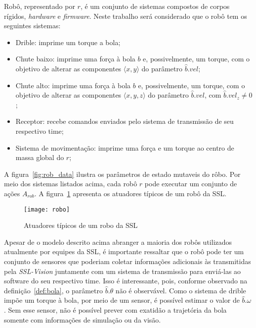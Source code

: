 
\begin{defi}[Robô]
  Robô, representado por $r$, é um conjunto de sistemas compostos
  de corpos rígidos, \textit{hardware} e \textit{firmware}. Neste
  trabalho será considerado que o robô tem os seguintes sistemas:

  \begin{itemize}
    \item Drible: imprime um torque a bola;
    \item Chute baixo: imprime uma força à bola $b$
          e, possivelmente, um torque, com o objetivo de
          alterar as componentes $\langle x,y \rangle$
          do parâmetro $\hat{b}.vel$;
    \item Chute alto: imprime uma força à bola $b$
          e, possivelmente, um torque, com o objetivo de
          alterar as componentes $\langle x,y,z \rangle$
          do parâmetro $\hat{b}.vel$, com $\hat{b}.vel_z \neq 0$;
    \item Receptor: recebe comandos enviados pelo sistema de
          transmissão de seu respectivo time;
    \item Sistema de movimentação: imprime uma força e um torque
          ao centro de massa global do $r$;
  \end{itemize}
\end{defi}

  A figura~\ref{fig:rob_data} ilustra os parâmetros de estado mutaveis
  do rôbo. Por meio dos sistemas listados acima, cada robô $r$ pode
  executar um conjunto de ações $A_{rob}$. A figura~\ref{fig:robo}
  apresenta os atuadores típicos de um robô da SSL.

  \begin{figure}[H]
    \centering
    \texttt{[image: robo]}
    \caption{Atuadores típicos de um robo da SSL}\label{fig:robo}
  \end{figure}

  Apesar de o modelo descrito acima abranger a maioria dos
  robôs utilizados atualmente por equipes da SSL, é importante
  ressaltar que o robô pode ter um conjunto de sensores que
  poderiam coletar informações adicionais às transmitidas pela
  \textit{SSL-Vision} juntamente com um sistema de transmissão
  para enviá-las ao software do seu respectivo time. Isso é
  interessante, pois, conforme observado na definição~\ref{def:bola},
  o parâmetro $\hat{b}.\theta$ não é observável. Como o sistema de
  drible impõe um torque à bola, por meio de um sensor, é possível
  estimar o valor de $\hat{b}.\omega$. Sem esse sensor, não é possível
  prever com exatidão a trajetória da bola somente com informações de
  simulação ou da visão.


